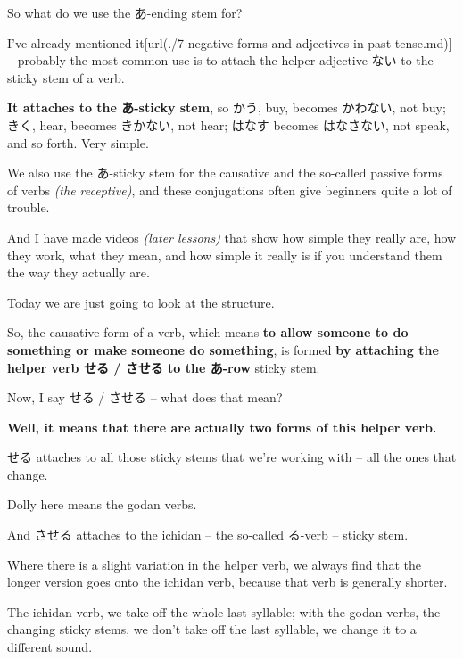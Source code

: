 So what do we use the あ-ending stem for?

\startsectionlevel[title={Helper adjective ない},reference={helper-adjective-ない}]

I've already mentioned it\goto{{[}7{]}}[url(./7-negative-forms-and-adjectives-in-past-tense.md)] -- probably the most common use is to attach the helper adjective ない to the sticky stem of a verb.

{}

{\bf It attaches to the あ-sticky stem}, so かう, buy, becomes かわない, not buy;\crlf
きく, hear, becomes きかない, not hear;\crlf
はなす becomes はなさない, not speak, and so forth. Very simple.

\stopsectionlevel

\startsectionlevel[title={The causative},reference={the-causative}]

We also use the あ-sticky stem for the causative and the so-called passive forms of verbs {\em (the receptive)}, and these conjugations often give beginners quite a lot of trouble.

And I have made videos {\em (later lessons)} that show how simple they really are, how they work, what they mean, and how simple it really is if you understand them the way they actually are.

Today we are just going to look at the structure.

So, the causative form of a verb, which means {\bf to allow someone to do something or make someone do something}, is formed {\bf by attaching the helper verb せる / させる to the あ-row} sticky stem.

{}

Now, I say せる / させる -- what does that mean?

{\bf Well, it means that there are actually two forms of this helper verb.}

せる attaches to all those sticky stems that we're working with -- all the ones that change.

Dolly here means the godan verbs.

And させる attaches to the ichidan -- the so-called る-verb -- sticky stem.

Where there is a slight variation in the helper verb, we always find that the longer version goes onto the ichidan verb, because that verb is generally shorter.

\thinrule

The ichidan verb, we take off the whole last syllable; with the godan verbs, the changing sticky stems, we don't take off the last syllable, we change it to a different sound.

